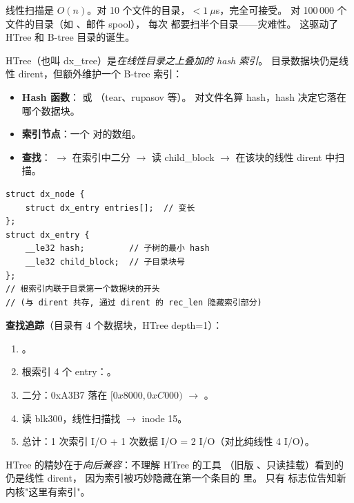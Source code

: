 \begin{filesystemlayout}

线性扫描是 $O(n)$。对 10 个文件的目录，$<1~\mu$s，完全可接受。
对 100\,000 个文件的目录（如 、邮件 spool），
每次  都要扫半个目录——灾难性。
这驱动了 HTree 和 B-tree 目录的诞生。


HTree（也叫 dx\_tree）是\emph{在线性目录之上叠加的 hash 索引}。
目录数据块仍是线性 dirent，但额外维护一个 B-tree 索引：

\begin{itemize}\tightlist
\item \textbf{Hash 函数}： 或 （tear、rupasov 等）。
  对文件名算 hash，hash 决定它落在哪个数据块。
\item \textbf{索引节点}：一个  对的数组。
\item \textbf{查找}： $\rightarrow$ 在索引中二分 $\rightarrow$
  读 child\_block $\rightarrow$ 在该块的线性 dirent 中扫描。
\end{itemize}

\begin{lstlisting}
struct dx_node {
    struct dx_entry entries[];  // 变长
};
struct dx_entry {
    __le32 hash;         // 子树的最小 hash
    __le32 child_block;  // 子目录块号
};
// 根索引内联于目录第一个数据块的开头
// (与 dirent 共存, 通过 dirent 的 rec_len 隐藏索引部分)
\end{lstlisting}

\textbf{查找追踪}（目录有 4 个数据块，HTree depth=1）：

\begin{enumerate}\tightlist
\item {}。
\item 根索引 4 个 entry：。
\item 二分：0xA3B7 落在 $[0x8000, 0xC000)$ $\rightarrow$ 。
\item 读 blk300，线性扫描找  $\rightarrow$ inode 15。
\item 总计：1 次索引 I/O + 1 次数据 I/O = 2 I/O（对比纯线性 4 I/O）。
\end{enumerate}

\begin{keyidea}
HTree 的精妙在于\emph{向后兼容}：不理解 HTree 的工具
（旧版 、只读挂载）看到的仍是线性 dirent，
因为索引被巧妙隐藏在第一个条目的  里。
只有  标志位告知新内核"这里有索引"。
\end{keyidea}


\end{filesystemlayout}
